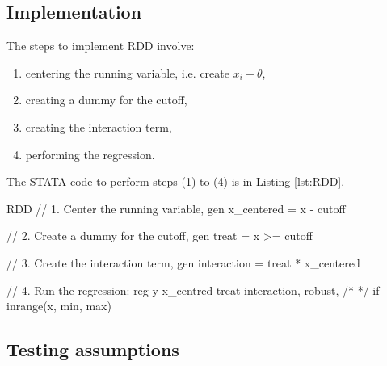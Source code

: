         \subsection{Implementation}
            The steps to implement RDD involve:
            \begin{enumerate}[(1)]
                \item centering the running variable, i.e. create $x_i-\theta$, 
                \item creating a dummy for the cutoff,
                \item creating the interaction term,
                \item performing the regression.
            \end{enumerate}
            The STATA code to perform steps (1) to (4) is in Listing \ref{lst:RDD}.
            \begin{sexylisting}[colback=white, label=lst:RDD]{RDD}
//  1. Center the running variable,
    gen x_centered = x - cutoff
    
//  2. Create a dummy for the cutoff,
    gen treat = x >= cutoff
    
//  3. Create the interaction term,
    gen interaction = treat * x_centered

//  4. Run the regression:
    reg y x_centred treat interaction, robust, /*
    */  if inrange(x, min, max)
            \end{sexylisting}

        \subsection{Testing assumptions}



                




            

            